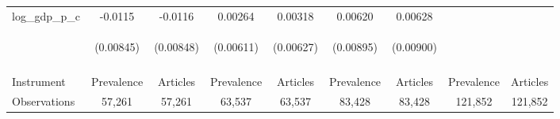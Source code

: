 \documentclass{article}
\begin{document}
\begin{table}[htbp]
{\begin{tabular}{lcccccccc}
log\_gdp\_p\_c & -0.0115 & -0.0116 & 0.00264 & 0.00318 & 0.00620 & 0.00628 &  &  \\
 & \begin{footnotesize}(0.00845)\end{footnotesize} & \begin{footnotesize}(0.00848)\end{footnotesize} & \begin{footnotesize}(0.00611)\end{footnotesize} & \begin{footnotesize}(0.00627)\end{footnotesize} & \begin{footnotesize}(0.00895)\end{footnotesize} & \begin{footnotesize}(0.00900)\end{footnotesize} & \begin{footnotesize}\end{footnotesize} & \begin{footnotesize}\end{footnotesize} \\
\vspace{4pt} & \begin{footnotesize}\end{footnotesize} & \begin{footnotesize}\end{footnotesize} & \begin{footnotesize}\end{footnotesize} & \begin{footnotesize}\end{footnotesize} & \begin{footnotesize}\end{footnotesize} & \begin{footnotesize}\end{footnotesize} & \begin{footnotesize}\end{footnotesize} & \begin{footnotesize}\end{footnotesize} \\ \hline
\vspace{4pt} Instrument & Prevalence & Articles & Prevalence & Articles & Prevalence & Articles & Prevalence & Articles \\ \hline
Observations & 57,261 & 57,261 & 63,537 & 63,537 & 83,428 & 83,428 & 121,852 & 121,852 \\

\end{tabular}}
\end{table}
\end{document}
